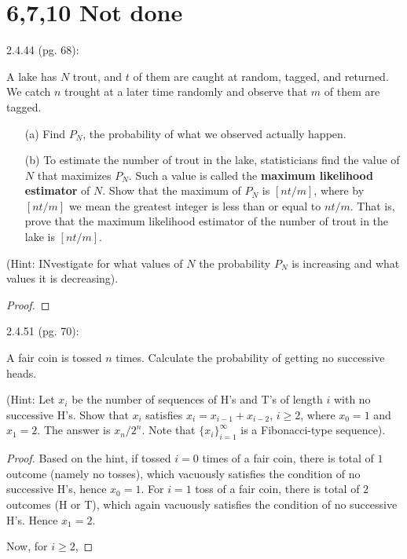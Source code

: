 \documentclass{article}
\begin{document}
\newpage

\section*{6,7,10 Not done}
\begin{ques}\label{q6}
    2.4.44 (pg. 68):

    A lake has $N$ trout, and $t$ of them are caught at random, tagged, and returned. We catch $n$ trought at a later time randomly and observe that $m$ of them are tagged.
    \begin{itemize}
        \item[(a)] Find $P_N$, the probability of what we observed actually happen.
        \item[(b)] To estimate the number of trout in the lake, statisticians find the value of $N$ that maximizes $P_N$. Such a value is called the \textbf{maximum likelihood estimator} of $N$. Show that the maximum of $P_N$ is $[nt/m]$, where by $[nt/m]$ we mean the greatest integer is less than or equal to $nt/m$. That is, prove that the maximum likelihood estimator of the number of trout in the lake is $[nt/m]$. 
    \end{itemize}

    (Hint: INvestigate for what values of $N$ the probability $P_N$ is increasing and what values it is decreasing).
\end{ques}

\begin{proof}
    
\end{proof}

\hfil

\begin{ques}\label{q7}
    2.4.51 (pg. 70):

    A fair coin is tossed $n$ times. Calculate the probability of getting no successive heads.

    (Hint: Let $x_i$ be the number of sequences of H's and T's of length $i$ with no successive H's. Show that $x_i$ satisfies $x_i=x_{i-1}+x_{i-2}$, $i\geq 2$, where $x_0=1$ and $x_1=2$. The answer is $x_n/2^n$. Note that $\{x_i\}_{i=1}^\infty$ is a Fibonacci-type sequence).
\end{ques}

\begin{proof}
    Based on the hint, if tossed $i=0$ times of a fair coin, there is total of $1$ outcome (namely no tosses), which vacuously satisfies the condition of no successive H's, hence $x_0=1$. For $i=1$ toss of a fair coin, there is total of $2$ outcomes (H or T), which again vacuously satisfies the condition of no successive H's. Hence $x_1=2$.

    Now, for $i\geq 2$, 
\end{proof}
\end{document}
